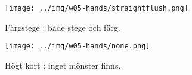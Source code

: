 \begin{figure}[H]
 \begin{minipage}[c]{\CardWidth}
  \texttt{[image: ../img/w05-hands/straightflush.png]}
 \end{minipage}\hfill
 \begin{minipage}[c]{\CardCaptionWidth}
  \caption{Färgstege : både stege och färg.}
 \end{minipage}
\end{figure}

\begin{figure}[H]
 \begin{minipage}[c]{\CardWidth}
  \texttt{[image: ../img/w05-hands/none.png]}
 \end{minipage}\hfill
 \begin{minipage}[c]{\CardCaptionWidth}
  \caption{Högt kort : inget mönster finns.}
 \label{lab:shuffle:last-picture}
  \end{minipage}
\end{figure}
